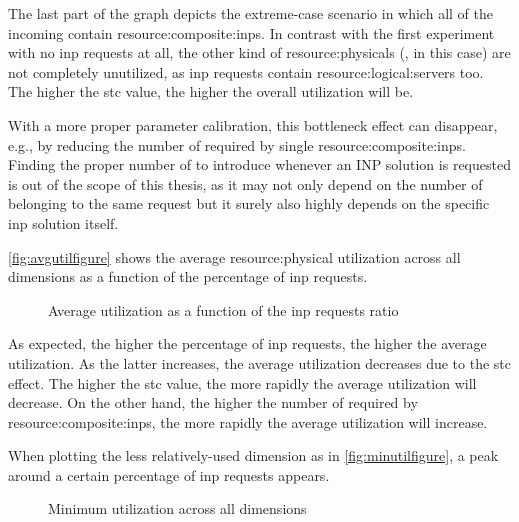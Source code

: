 The last part of the graph depicts the extreme-case scenario in which all of the incoming  contain \glspl{resource:composite:inp}.
In contrast with the first experiment with no \gls{inp} requests at all, the other kind of \glspl{resource:physical} (, in this case) are not completely unutilized, as \gls{inp} requests contain \glspl{resource:logical:server} too.
The higher the \gls{stc} value, the higher the overall  utilization will be.

With a more proper parameter calibration, this  bottleneck effect can disappear, e.g., by reducing the number of  required by single \glspl{resource:composite:inp}.
Finding the proper number of  to introduce whenever an INP solution is requested is out of the scope of this thesis, as it may not only depend on the number of  belonging to the same request but it surely also highly depends on the specific \gls{inp} solution itself.

\autoref{fig:avgutilfigure} shows the average \gls{resource:physical} utilization across all dimensions as a function of the percentage of \gls{inp} requests.

\begin{figure}[!htb]
    \centering
    \usebox{\avgutilfigure}
    \caption{Average  utilization as a function of the \gls{inp} requests ratio}
    \label{fig:avgutilfigure}
\end{figure}

As expected, the higher the percentage of \gls{inp} requests, the higher the average  utilization.
As the latter increases, the average  utilization decreases due to the \gls{stc} effect.
The higher the \gls{stc} value, the more rapidly the average  utilization will decrease.
On the other hand, the higher the number of  required by \glspl{resource:composite:inp}, the more rapidly the average  utilization will increase.

When plotting the less relatively-used  dimension as in \autoref{fig:minutilfigure}, a peak around a certain percentage of \gls{inp} requests appears.

\begin{figure}[!htb]
    \centering
    \usebox{\minutilfigure}
    \caption{Minimum  utilization across all dimensions}
    \label{fig:minutilfigure}
\end{figure}

